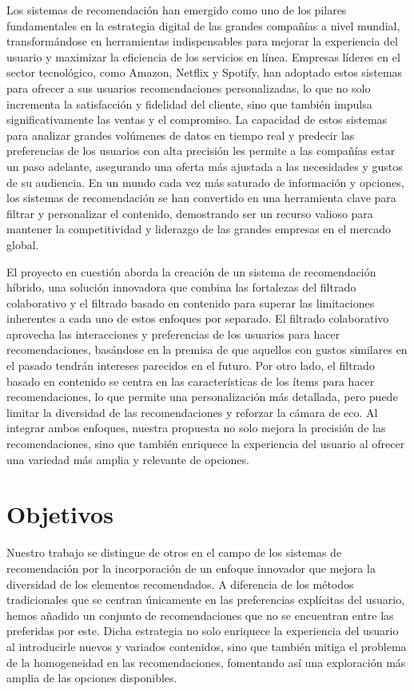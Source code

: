 \documentclass[a4paper,12pt]{report}
\begin{document}
    Los sistemas de recomendación han emergido como uno de los pilares fundamentales en la estrategia digital de las grandes compañías a nivel mundial, transformándose en herramientas indispensables para mejorar la experiencia del usuario y maximizar la eficiencia de los servicios en línea. Empresas líderes en el sector tecnológico, como Amazon, Netflix y Spotify, han adoptado estos sistemas para ofrecer a sus usuarios recomendaciones personalizadas, lo que no solo incrementa la satisfacción y fidelidad del cliente, sino que también impulsa significativamente las ventas y el compromiso. La capacidad de estos sistemas para analizar grandes volúmenes de datos en tiempo real y predecir las preferencias de los usuarios con alta precisión les permite a las compañías estar un paso adelante, asegurando una oferta más ajustada a las necesidades y gustos de su audiencia. En un mundo cada vez más saturado de información y opciones, los sistemas de recomendación se han convertido en una herramienta clave para filtrar y personalizar el contenido, demostrando ser un recurso valioso para mantener la competitividad y liderazgo de las grandes empresas en el mercado global.

    El proyecto en cuestión aborda la creación de un sistema de recomendación híbrido, una solución innovadora que combina las fortalezas del filtrado colaborativo y el filtrado basado en contenido para superar las limitaciones inherentes a cada uno de estos enfoques por separado. El filtrado colaborativo aprovecha las interacciones y preferencias de los usuarios para hacer recomendaciones, basándose en la premisa de que aquellos con gustos similares en el pasado tendrán intereses parecidos en el futuro. Por otro lado, el filtrado basado en contenido se centra en las características de los ítems para hacer recomendaciones, lo que permite una personalización más detallada, pero puede limitar la diversidad de las recomendaciones y reforzar la cámara de eco.
    Al integrar ambos enfoques, nuestra propuesta no solo mejora la precisión de las recomendaciones, sino que también enriquece la experiencia del usuario al ofrecer una variedad más amplia y relevante de opciones.

    \section{Objetivos}

    Nuestro trabajo se distingue de otros en el campo de los sistemas de recomendación por la incorporación de un enfoque innovador que mejora la diversidad de los elementos recomendados. A diferencia de los métodos tradicionales que se centran únicamente en las preferencias explícitas del usuario, hemos añadido un conjunto de recomendaciones que no se encuentran entre las preferidas por este. Dicha estrategia no solo enriquece la experiencia del usuario al introducirle nuevos y variados contenidos, sino que también mitiga el problema de la homogeneidad en las recomendaciones, fomentando así una exploración más amplia de las opciones disponibles. 
\end{document}
